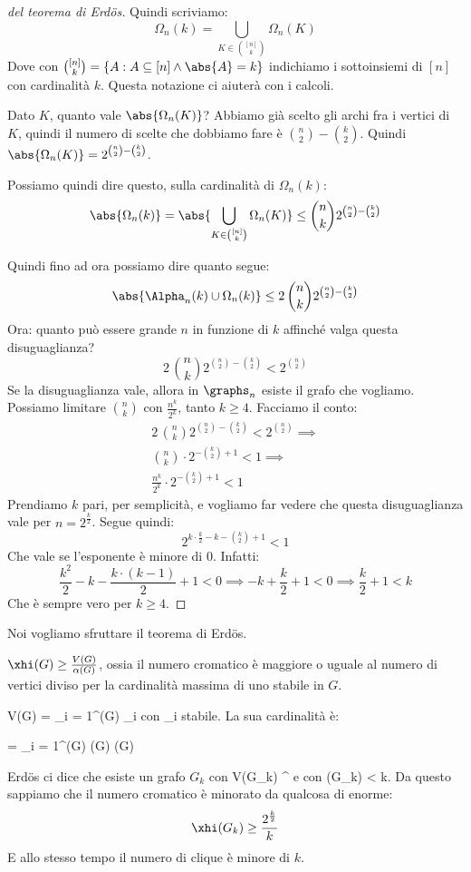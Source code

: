 \begin{proof}[del teorema di Erd\"os]
		Quindi scriviamo:
		\[
			\Omega_n (k) = \bigcup_{K \in \binom{[n]}{k}} \Omega_n (K)
		\]
		Dove con $\binom{[n]}{k} = \{ A : A \subseteq [n] \land \abs{A} = k \}$ indichiamo i sottoinsiemi di $[n]$ con cardinalit\`a $k$.
		Questa notazione ci aiuter\`a con i calcoli.

		Dato $K$, quanto vale $\abs{\Omega_n (K)}$?
		Abbiamo gi\`a scelto gli archi fra i vertici di $K$, quindi il numero di scelte che dobbiamo fare \`e $\binom{n}{2} - \binom{k}{2}$.
		Quindi $\abs{\Omega_n (K)} = 2^{\binom{n}{2} - \binom{k}{2}}$.

		Possiamo quindi dire questo, sulla cardinalit\`a di $\Omega_n (k)$:
		\[
			\abs{\Omega_n (k)} = \abs{\bigcup_{K \in \binom{[n]}{k}} \Omega_n (K)} \le
			\binom{n}{k} 2^{\binom{n}{2} - \binom{k}{2}}
		\]

		Quindi fino ad ora possiamo dire quanto segue:
		\[
			\abs{\Alpha_n (k) \cup \Omega_n (k)} \le 2 \, \binom{n}{k} 2^{\binom{n}{2} - \binom{k}{2}}
		\]
		Ora: quanto pu\`o essere grande $n$ in funzione di $k$ affinch\'e valga questa disuguaglianza?
		\[
			2 \, \binom{n}{k} 2^{\binom{n}{2} - \binom{k}{2}} < 2^{\binom{n}{2}}
		\]
		Se la disuguaglianza vale, allora in $\graphs_n$ esiste il grafo che vogliamo.
		Possiamo limitare $\binom{n}{k}$ con $\frac{n^k}{2^k}$, tanto $k \ge 4$.
		Facciamo il conto:
		\begin{align*}
			2 \, \binom{n}{k} 2^{\binom{n}{2} - \binom{k}{2}} < 2^{\binom{n}{2}} \implies \\
			\binom{n}{k} \cdot 2^{- \binom{k}{2} + 1} < 1 \implies \\
			\frac{n^k}{2^k} \cdot 2^{- \binom{k}{2} + 1} < 1
		\end{align*}
		Prendiamo $k$ pari, per semplicit\`a, e vogliamo far vedere che questa disuguaglianza vale per $n = 2^{\frac{k}{2}}$.
		Segue quindi:
		\[
			2^{k \cdot \frac{k}{2} - k - \binom{k}{2} + 1} < 1
		\]
		Che vale se l'esponente \`e minore di $0$.
		Infatti:
		\[
			\frac{k^2}{2} - k - \frac{k \cdot (k - 1)}{2} + 1 < 0 \implies
			- k + \frac{k}{2} + 1 < 0 \implies
			\frac{k}{2} + 1 < k
		\]
		Che \`e sempre vero per $k \ge 4$.
	\end{proof}

	Noi vogliamo sfruttare il teorema di Erd\"os.
	\begin{oss}
		$\xhi (G) \ge \frac{V(G)}{\alpha(G)}$, ossia il numero cromatico \`e maggiore o uguale al numero di vertici diviso per la cardinalit\`a massima di uno stabile in $G$.
	\end{oss}

	V(G) = \bigcup_{i = 1}^{\xhi(G)} \Alpha_i con \Alpha_i stabile.
	La sua cardinalit\`a \`e:

	 = \sum_{i = 1}^{\xhi(G)}  \le \xhi(G) \cdot \alpha(G)

	Erd\"os ci dice che esiste un grafo $G_k$ con V(G_k) ^{} e con \alpha(G_k) < k.
	Da questo sappiamo che il numero cromatico \`e minorato da qualcosa di enorme:
	\[
		\xhi(G_k) \ge \frac{2^{\frac{k}{2}}}{k}
	\]
	E allo stesso tempo il numero di clique \`e minore di $k$.

